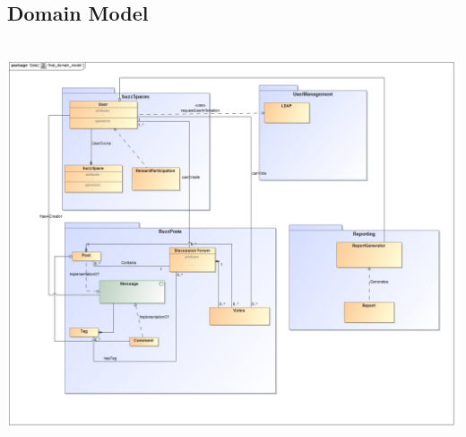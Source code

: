 \documentclass[a4paper,12pt]{report}
\begin{document}
\newpage
\subsection{Domain Model}
\emph{}\\
\includegraphics[width=1\textwidth]{./final_domain_model_a.jpg}\\[0.4cm]
\end{document}
